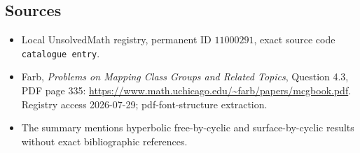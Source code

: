 \documentclass[11pt]{article}
\begin{document}
\subsection{Sources}
\begin{itemize}
\item Local UnsolvedMath registry, permanent ID \(11000291\), exact source code \texttt{catalogue entry}.
\item Farb, \emph{Problems on Mapping Class Groups and Related Topics}, Question 4.3, PDF page 335: \url{https://www.math.uchicago.edu/~farb/papers/mcgbook.pdf}. Registry access 2026-07-29; pdf-font-structure extraction.
\item The summary mentions hyperbolic free-by-cyclic and surface-by-cyclic results without exact bibliographic references.
\end{itemize}
\end{document}

